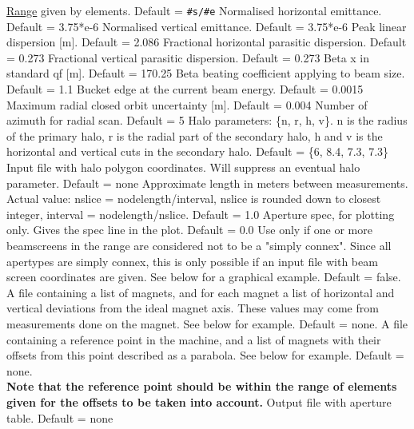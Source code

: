 \begin{madlist}
    \hyperref[sec:range]{Range} given by
     elements. Default = {\tt \#s/\#e}  
    Normalised horizontal emittance. Default = 3.75*e-6  
    Normalised vertical emittance. Default = 3.75*e-6 
    Peak linear dispersion [m]. Default = 2.086 
    Fractional horizontal parasitic dispersion. Default = 0.273 
    Fractional vertical parasitic dispersion. Default = 0.273 
    Beta x in standard qf [m]. Default = 170.25 
    Beta beating coefficient applying to beam size. Default = 1.1 
    Bucket edge at the current beam energy. Default = 0.0015 
    Maximum radial closed orbit uncertainty [m]. Default = 0.004 
    Number of azimuth for radial scan. Default = 5 
    Halo parameters: \{n, r, h, v\}. n is the radius of the
     primary halo,  r is the radial part of the secondary halo, h and v
     is the horizontal and  vertical cuts in the secondary halo. Default
     = \{6, 8.4, 7.3, 7.3\}  
    Input file with halo polygon coordinates. Will
     suppress  an eventual halo parameter. Default = none  
    Approximate length in meters between
     measurements. Actual value:  nslice = nodelength/interval, nslice
     is rounded down to closest integer,  interval =
     nodelength/nslice. Default = 1.0  
    Aperture spec, for plotting only. Gives the spec line in
     the plot. Default = 0.0  
    Use only if one or more beamscreens in the range are
     considered not to  be a "simply connex". Since all \madx apertypes
     are simply connex, this is only possible  if an input file with
     beam screen coordinates are given. See below for a graphical
     example. Default = false.  
    A file containing a list of magnets, and for each
     magnet a list of horizontal and vertical deviations from the ideal
     magnet axis. These values may come from measurements done on the
     magnet. See below for example. Default = none.  
    A file containing a reference point in the machine,
     and a list of magnets with their offsets from this point described
     as a parabola. See below for example. Default = none. \\
     {\bf Note that the reference point should be within the range of
       elements given for the offsets to be taken into account.}
    Output file with aperture table. Default = none 
\end{madlist}


